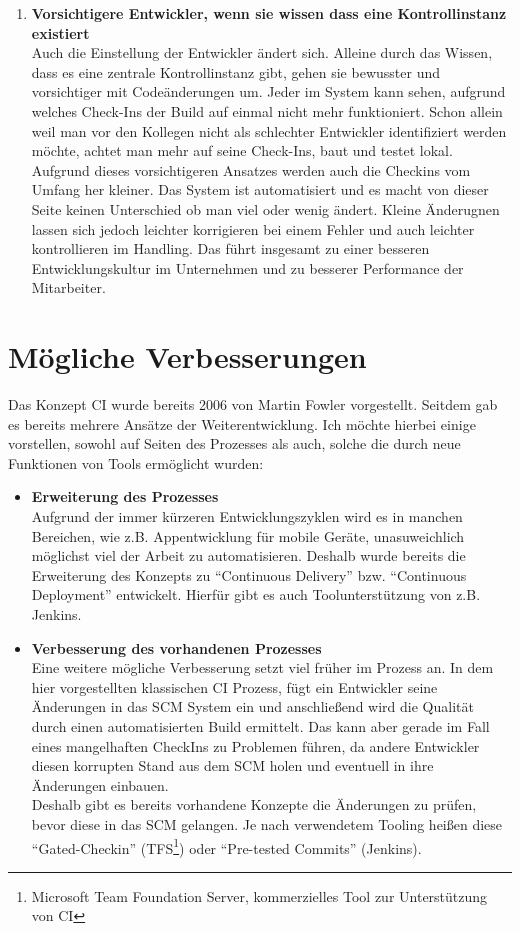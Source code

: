 \begin{enumerate}
	\item \textbf{Vorsichtigere Entwickler, wenn sie wissen dass eine Kontrollinstanz existiert}\\
	Auch die Einstellung der Entwickler ändert sich. Alleine durch das Wissen, dass es eine zentrale Kontrollinstanz gibt, gehen sie bewusster und vorsichtiger mit Codeänderungen um. Jeder im System kann sehen, aufgrund welches Check-Ins der Build auf einmal nicht mehr funktioniert. Schon allein weil man vor den Kollegen nicht als schlechter Entwickler identifiziert werden möchte, achtet man mehr auf seine Check-Ins, baut und testet lokal. Aufgrund dieses vorsichtigeren Ansatzes werden auch die Checkins vom Umfang her kleiner. Das System ist automatisiert und es macht von dieser Seite keinen Unterschied ob man viel oder wenig ändert. Kleine Änderugnen lassen sich jedoch leichter korrigieren bei einem Fehler und auch leichter kontrollieren im Handling. Das führt insgesamt zu einer besseren Entwicklungskultur im Unternehmen und zu besserer Performance der Mitarbeiter.
\end{enumerate}
	
\section{Mögliche Verbesserungen}
Das Konzept CI wurde bereits 2006 von Martin Fowler vorgestellt. Seitdem gab es bereits mehrere Ansätze der Weiterentwicklung. Ich möchte hierbei einige vorstellen, sowohl auf Seiten des Prozesses als auch, solche die durch neue Funktionen von Tools ermöglicht wurden:
\begin{itemize}
	\item \textbf{Erweiterung des Prozesses}\\
 Aufgrund der immer kürzeren Entwicklungszyklen wird es in manchen Bereichen, wie z.B. Appentwicklung für mobile Geräte, unasuweichlich möglichst viel der Arbeit zu automatisieren. Deshalb wurde bereits die Erweiterung des Konzepts zu "`Continuous Delivery"' bzw. "`Continuous Deployment"' entwickelt. Hierfür gibt es auch Toolunterstützung von z.B. Jenkins.
	\item \textbf{Verbesserung des vorhandenen Prozesses}\\
Eine weitere mögliche Verbesserung setzt viel früher im Prozess an. In dem hier vorgestellten klassischen CI Prozess, fügt ein Entwickler seine Änderungen in das SCM System ein und anschließend wird die Qualität durch einen automatisierten Build ermittelt. Das kann aber gerade im Fall eines mangelhaften CheckIns zu Problemen führen, da andere Entwickler diesen korrupten Stand aus dem SCM holen und eventuell in ihre Änderungen einbauen.\\
Deshalb gibt es bereits vorhandene Konzepte die Änderungen zu prüfen, bevor diese in das SCM gelangen. Je nach verwendetem Tooling heißen diese "`Gated-Checkin"' (TFS\footnote{Microsoft Team Foundation Server, kommerzielles Tool zur Unterstützung von CI}) oder "`Pre-tested Commits"' (Jenkins).

\end{itemize} 